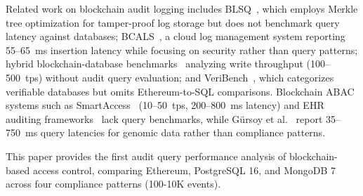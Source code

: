 \documentclass[conference]{IEEEtran}
\begin{document}
Related work on blockchain audit logging includes BLSQ~\cite{li2024blsq}, which employs Merkle tree optimization for tamper-proof log storage but does not benchmark query latency against databases; BCALS~\cite{bcals2022}, a cloud log management system reporting 55--65~ms insertion latency while focusing on security rather than query patterns; hybrid blockchain-database benchmarks~\cite{hybrid_bcdb2022} analyzing write throughput (100--500~tps) without audit query evaluation; and VeriBench~\cite{veribench2023}, which categorizes verifiable databases but omits Ethereum-to-SQL comparisons. Blockchain ABAC systems such as SmartAccess~\cite{oliveira2022smartaccess} (10--50~tps, 200--800~ms latency) and EHR auditing frameworks~\cite{ullah2024ehr} lack query benchmarks, while G{\"u}rsoy et al.~\cite{gursoy2020eth} report 35--750~ms query latencies for genomic data rather than compliance patterns.

This paper provides the first audit query performance analysis of blockchain-based access control, comparing Ethereum, PostgreSQL 16, and MongoDB 7 across four compliance patterns (100-10K events).



\end{document}
